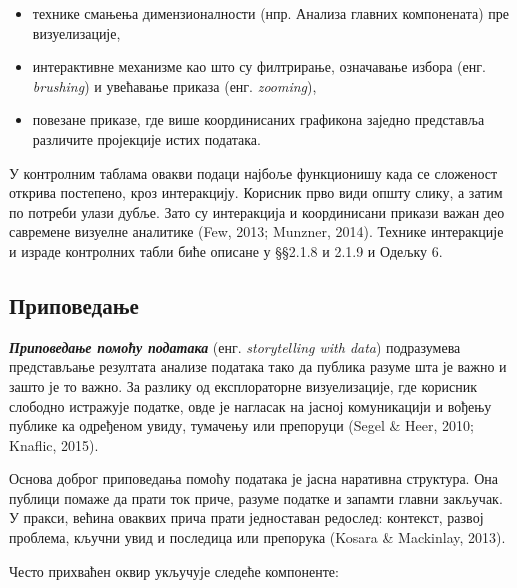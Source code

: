\begin{itemize}
  \item технике смањења димензионалности (нпр. Анализа главних компонената) пре визуелизације,
  \item интерактивне механизме као што су филтрирање, означавање избора (енг. \textit{brushing}) и увећавање приказа (енг. \textit{zooming}),
  \item повезане приказе, где више координисаних графикона заједно представља различите пројекције истих података.
\end{itemize}
У контролним таблама овакви подаци најбоље функционишу када се сложеност открива постепено, кроз интеракцију. Корисник прво види општу слику, а затим по потреби улази дубље. Зато су интеракција и координисани прикази важан део савремене визуелне аналитике (Few, 2013; Munzner, 2014). Технике интеракције и израде контролних табли биће описане у §§2.1.8 и 2.1.9 и Одељку 6.

\subsection{Приповедање}
\textbf{\textit{Приповедање помоћу података}} (енг. \textit{storytelling with data}) подразумева представљање резултата анализе података тако да публика разуме шта је важно и зашто је то важно. За разлику од експлораторне визуелизације, где корисник слободно истражује податке, овде је нагласак на јасној комуникацији и вођењу публике ка одређеном увиду, тумачењу или препоруци (Segel \& Heer, 2010; Knaflic, 2015).

Основа доброг приповедања помоћу података је јасна наративна структура. Она публици помаже да прати ток приче, разуме податке и запамти главни закључак. У пракси, већина оваквих прича прати једноставан редослед: контекст, развој проблема, кључни увид и последица или препорука (Kosara \& Mackinlay, 2013).

Често прихваћен оквир укључује следеће компоненте:

